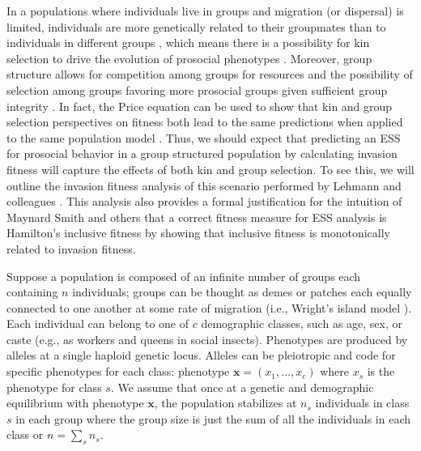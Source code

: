 \documentclass[11pt]{article}
\renewcommand{\vec}[1]{\symbf{#1}}
\newcommand{\numc}{c}
\begin{document}
In a populations where individuals live in groups and migration (or dispersal) is limited, individuals are more genetically related to their groupmates than to individuals in different groups \cite{Wright:1943,Wright:1951,Hamilton:1970}, which means there is a possibility for kin selection to drive the evolution of prosocial phenotypes \cite{Hamilton:1964,Rousset:2004,Lehmann:Rousset:2014}. Moreover, group structure allows for competition among groups for resources and the possibility of selection among groups favoring more prosocial groups given sufficient group integrity \cite{Hamilton:1975,Wilson:Pollock:1992,Traulsen:Nowak:2006,Gardner:West:2006,Lehmann:Rousset:2010}. In fact, the Price equation \cite{Price:1970,Price:1972:cov} can be used to show that kin and group selection perspectives on fitness both lead to the same predictions when applied to the same population model \cite{Queller:1992,Lehmann:Keller:2007,Bijma:Wade:2008,Gardner:West:2007,Marshall:2011,Akcay:VanCleve:2012}. Thus, we should expect that predicting an ESS for prosocial behavior in a group structured population by calculating invasion fitness will capture the effects of both kin and group selection. To see this, we will outline the invasion fitness analysis of this scenario performed by Lehmann and colleagues \cite{Lehmann:Mullon:2016,Lehmann:Rousset:2020}. This analysis also provides a formal justification for the intuition of Maynard Smith \cite{MaynardSmith:1978} and others that a correct fitness measure for ESS analysis is Hamilton's inclusive fitness \cite{Hamilton:1964} by showing that inclusive fitness is monotonically related to invasion fitness.

Suppose a population is composed of an infinite number of groups each containing $n$ individuals; groups can be thought as demes or patches each  equally connected to one another at some rate of migration (i.e., Wright's island model \cite{Wright:1931}). Each individual can belong to one of $\numc$ demographic classes, such as age, sex, or caste (e.g., as workers and queens in social insects). Phenotypes are produced by alleles at a single haploid genetic locus. Alleles can be pleiotropic and code for specific phenotypes for each class: phenotype $\vec{x}=(x_{1},\ldots,x_{\numc})$ where $x_{s}$ is the phenotype for class $s$. We assume that once at a genetic and demographic equilibrium with phenotype $\vec{x}$, the population stabilizes at $n_{s}$ individuals in class $s$ in each group where the group size is just the sum of all the individuals in each class or $n = \sum_{s} n_{s}$.
\end{document}
